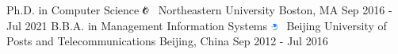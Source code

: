 \documentclass[letterpaper]{awesome-cv}
\begin{document}
\makecvheader

\addvspace{4ex}
\addvspace{1ex}

\begin{cventries}
  \cventrynodescription
    {Ph.D. in Computer Science \hspace{0.2ex} }
    {\includegraphics[width=0.016\textwidth]{../images/logos/northeastern.png}~ Northeastern University}
    {Boston, MA}
    {Sep 2016 - Jul 2021}
    {}
 \cventrynodescription
    {B.B.A. in Management Information Systems \hspace{0.2ex} }
    {\includegraphics[width=0.016\textwidth]{../images/logos/bupt.png}~ Beijing University of Posts and Telecommunications}
    {Beijing, China}
    {Sep 2012 - Jul 2016}
    {}
\end{cventries}

\addvspace{2ex}
\addvspace{1ex}
\end{document}
